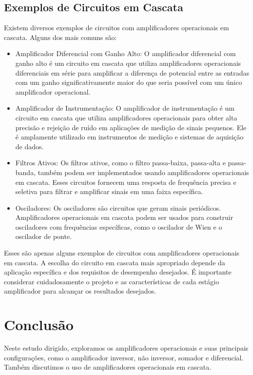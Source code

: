 \documentclass[12pt,twoside, a4paper, twocolumn]{article}
\begin{document}
\subsection{Exemplos de Circuitos em Cascata}


Existem diversos exemplos de circuitos com amplificadores operacionais em cascata. Alguns dos mais comuns são:


\begin{itemize}
    \item Amplificador Diferencial com Ganho Alto: O amplificador diferencial com ganho alto é um circuito em cascata que utiliza amplificadores operacionais diferenciais em série para amplificar a diferença de potencial entre as entradas com um ganho significativamente maior do que seria possível com um único amplificador operacional.
    \item Amplificador de Instrumentação: O amplificador de instrumentação é um circuito em cascata que utiliza amplificadores operacionais para obter alta precisão e rejeição de ruído em aplicações de medição de sinais pequenos. Ele é amplamente utilizado em instrumentos de medição e sistemas de aquisição de dados.
    \item Filtros Ativos: Os filtros ativos, como o filtro passa-baixa, passa-alta e passa-banda, também podem ser implementados usando amplificadores operacionais em cascata. Esses circuitos fornecem uma resposta de frequência precisa e seletiva para filtrar e amplificar sinais em uma faixa específica.
    \item Osciladores: Os osciladores são circuitos que geram sinais periódicos. Amplificadores operacionais em cascata podem ser usados para construir osciladores com frequências específicas, como o oscilador de Wien e o oscilador de ponte.
\end{itemize}


Esses são apenas alguns exemplos de circuitos com amplificadores operacionais em cascata. A escolha do circuito em cascata mais apropriado depende da aplicação específica e dos requisitos de desempenho desejados. É importante considerar cuidadosamente o projeto e as características de cada estágio amplificador para alcançar os resultados desejados.


\section{Conclusão}


Neste estudo dirigido, exploramos os amplificadores operacionais e suas principais configurações, como o amplificador inversor, não inversor, somador e diferencial. Também discutimos o uso de amplificadores operacionais em cascata.
\end{document}
